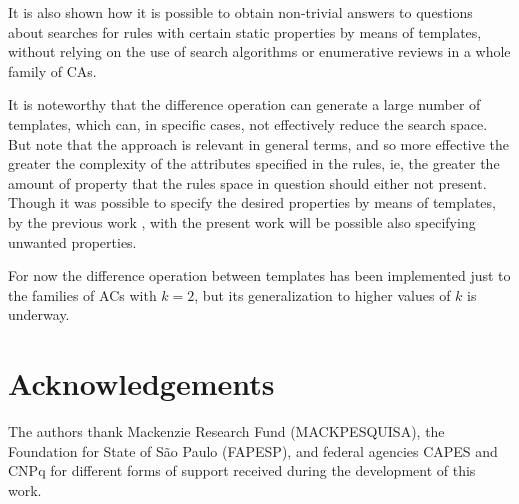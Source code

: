 \documentclass[12pt, a4paper]{article}
\begin{document}
It is also shown how it is possible to obtain non-trivial answers to questions about searches for rules with certain static properties by means of templates, without relying on the use of search algorithms or enumerative reviews in a whole family of CAs.

It is noteworthy that the difference operation can generate a large number of templates, which can, in specific cases, not effectively reduce the search space. But note that the approach is relevant in general terms, and so more effective the greater the complexity of the attributes specified in the rules, ie, the greater the amount of property that the rules space in question should either not present. Though it was possible to specify the desired properties by means of templates, by the previous work \cite{deOliveira2014,deOliveira2014b}, with the present work will be possible also specifying unwanted properties.

For now the difference operation between templates has been implemented just to the families of ACs with $k=2$, but its generalization to higher values of $k$ is underway.

\section*{Acknowledgements}
\label{sec:agrdecimentos}
The authors thank Mackenzie Research Fund (MACKPESQUISA), the Foundation for State of São Paulo (FAPESP), and federal agencies CAPES and CNPq for different forms of support received during the development of this work.

\def\refname{Bibliography}


\end{document}
